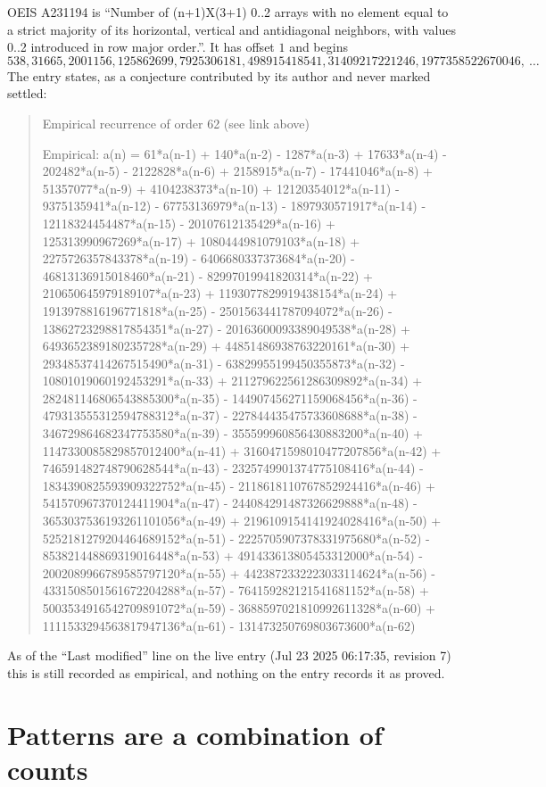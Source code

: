 \documentclass[11pt,a4paper]{article}
\theoremstyle{plain}
\theoremstyle{definition}
\begin{document}
OEIS A231194 is ``Number of (n+1)X(3+1) 0..2 arrays with no element equal to a strict majority of its horizontal, vertical and antidiagonal neighbors, with values 0..2 introduced in row major order.''. It has offset $1$ and begins
\[
538, 31665, 2001156, 125862699, 7925306181, 498915418541, 31409217221246, 1977358522670046,\ \dots
\]
The entry states, as a conjecture contributed by its author and never marked settled:
\begin{quote}
Empirical recurrence of order 62 (see link above)

Empirical: a(n) = 61*a(n-1) + 140*a(n-2) - 1287*a(n-3) + 17633*a(n-4) - 202482*a(n-5) - 2122828*a(n-6) + 2158915*a(n-7) - 17441046*a(n-8) + 51357077*a(n-9) + 4104238373*a(n-10) + 12120354012*a(n-11) - 9375135941*a(n-12) - 67753136979*a(n-13) - 1897930571917*a(n-14) - 12118324454487*a(n-15) - 20107612135429*a(n-16) + 125313990967269*a(n-17) + 1080444981079103*a(n-18) + 2275726357843378*a(n-19) - 6406680337373684*a(n-20) - 46813136915018460*a(n-21) - 82997019941820314*a(n-22) + 210650645979189107*a(n-23) + 1193077829919438154*a(n-24) + 1913978816196771818*a(n-25) - 2501563441787094072*a(n-26) - 13862723298817854351*a(n-27) - 20163600093389049538*a(n-28) + 6493652389180235728*a(n-29) + 44851486938763220161*a(n-30) + 29348537414267515490*a(n-31) - 63829955199450355873*a(n-32) - 10801019060192453291*a(n-33) + 211279622561286309892*a(n-34) + 282481146806543885300*a(n-35) - 144907456271159068456*a(n-36) - 479313555312594788312*a(n-37) - 227844435475733608688*a(n-38) - 346729864682347753580*a(n-39) - 355599960856430883200*a(n-40) + 1147330085829857012400*a(n-41) + 3160471598010477207856*a(n-42) + 746591482748790628544*a(n-43) - 2325749901374775108416*a(n-44) - 1834390825593909322752*a(n-45) - 2118618110767852924416*a(n-46) + 541570967370124411904*a(n-47) - 244084291487326629888*a(n-48) - 3653037536193261101056*a(n-49) + 2196109154141924028416*a(n-50) + 5252181279204464689152*a(n-51) - 2225705907378331975680*a(n-52) - 853821448869319016448*a(n-53) + 491433613805453312000*a(n-54) - 2002089966789585797120*a(n-55) + 4423872332223033114624*a(n-56) - 4331508501561672204288*a(n-57) - 764159282121541681152*a(n-58) + 5003534916542709891072*a(n-59) - 3688597021810992611328*a(n-60) + 1111533294563817947136*a(n-61) - 131473250769803673600*a(n-62)
\end{quote}
As of the ``Last modified'' line on the live entry (Jul 23 2025 06:17:35, revision 7) this is still
recorded as empirical, and nothing on the entry records it as proved.

\section{Patterns are a combination of counts}
\end{document}
